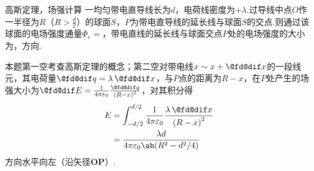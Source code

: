 {\hspace{-2.16em}
\begin{minipage}{0.67\textwidth}
\begin{exercise}{6}{高斯定理，场强计算}
    一均匀带电直导线长为$d$，电荷线密度为$+\lambda$.过导线中点$O$作一半径为$R$（$R>\frac{d}{2}$）的球面$S$，$P$为带电直导线的延长线与球面$S$的交点.则通过该球面的电场强度通量$\Phi_e=$，带电直线的延长线与球面交点$P$处的电场强度的大小为，方向.
\end{exercise}
\end{minipage}
\hfill
\begin{minipage}[c]{0.33\textwidth}
\begin{center}
\end{center}
\end{minipage}
\begin{solution}
    本题第一空考查高斯定理的概念；第二空对带电线$x\sim x+\d x$的一段线元，其电荷量$\d q=\lambda\d x$，与$P$点的距离为$R-x$，在$P$处产生的场强大小为$\d E=\frac{1}{4\pi\varepsilon_0}\frac{\d q}{\left(R-x\right)^2}$，对其积分得
    $$
    \begin{aligned}
        E&=\int_{-d/2}^{d/2} \frac{1}{4\pi\varepsilon_0}\frac{\lambda\d x}{\left(R-x\right)^2}\\
        &=\frac{\lambda d}{4\pi\varepsilon_0\ab(R^2-d^2/4)}
    \end{aligned}
    $$
    方向水平向左（沿矢径$\boldsymbol{OP}$）.
\end{solution}

}
\newpage
